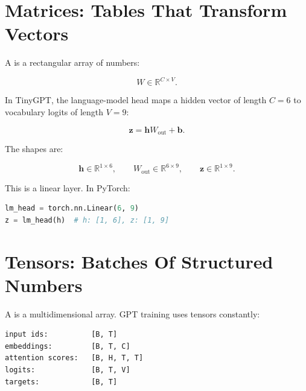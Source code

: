 \section{Matrices: Tables That Transform Vectors}

A  is a rectangular array of numbers:

\[
W \in \mathbb{R}^{C \times V}.
\]

In TinyGPT, the language-model head maps a hidden vector of length \(C=6\) to vocabulary logits of length \(V=9\):

\[
\mathbf{z} = \mathbf{h} W_{\text{out}} + \mathbf{b}.
\]

The shapes are:

\[
\mathbf{h} \in \mathbb{R}^{1 \times 6},
\qquad
W_{\text{out}} \in \mathbb{R}^{6 \times 9},
\qquad
\mathbf{z} \in \mathbb{R}^{1 \times 9}.
\]

\begin{center}
\end{center}

This is a linear layer. In PyTorch:

\begin{lstlisting}[language=Python]
lm_head = torch.nn.Linear(6, 9)
z = lm_head(h)  # h: [1, 6], z: [1, 9]
\end{lstlisting}

\section{Tensors: Batches Of Structured Numbers}

A  is a multidimensional array. GPT training uses tensors constantly:

\begin{lstlisting}
input ids:          [B, T]
embeddings:         [B, T, C]
attention scores:   [B, H, T, T]
logits:             [B, T, V]
targets:            [B, T]
\end{lstlisting}


